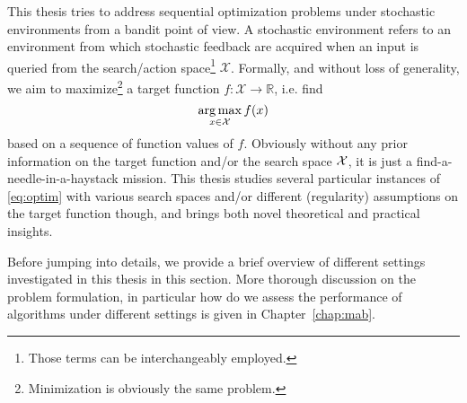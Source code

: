 This thesis tries to address sequential optimization problems under stochastic environments from a bandit point of view. A stochastic environment refers to an environment from which stochastic feedback are acquired when an input is queried from the search/action space\footnote{Those terms can be interchangeably employed.} $\mathcal{X}$. Formally, and without loss of generality, we aim to maximize\footnote{Minimization is obviously the same problem.} a target function $f:\mathcal{X}\rightarrow\mathbb{R}$, i.e. find 
\begin{equation}\label{eq:optim}
    \operatorname*{arg\,max}_{x\in\mathcal{X}} f(x)
\end{equation}
based on a sequence of function values of $f$. Obviously without any prior information on the target function and/or the search space $\mathcal{X}$, it is just a find-a-needle-in-a-haystack mission. This thesis studies several particular instances of \eqref{eq:optim} with various search spaces and/or different (regularity) assumptions on the target function though, and brings both novel theoretical and practical insights. 

Before jumping into details, we provide a brief overview of different settings investigated in this thesis in this section. More thorough discussion on the problem formulation, in particular how do we assess the performance of algorithms under different settings is given in Chapter~\ref{chap:mab}.



